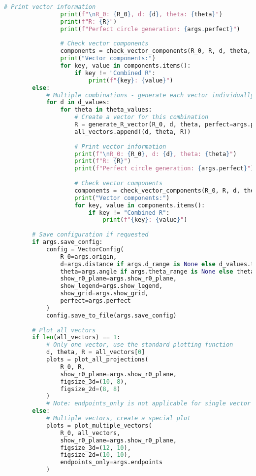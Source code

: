 \begin{lstlisting}[language=Python]
                # Print vector information
                print(f"\nR_0: {R_0}, d: {d}, theta: {theta}")
                print(f"R: {R}")
                print(f"Perfect circle generation: {args.perfect}")
                
                # Check vector components
                components = check_vector_components(R_0, R, d, theta, perfect=args.perfect)
                print("Vector components:")
                for key, value in components.items():
                    if key != "Combined R":
                        print(f"{key}: {value}")
        else:
            # Multiple combinations - generate each vector individually
            for d in d_values:
                for theta in theta_values:
                    # Create a vector for this combination
                    R = generate_R_vector(R_0, d, theta, perfect=args.perfect)
                    all_vectors.append((d, theta, R))
                    
                    # Print vector information
                    print(f"\nR_0: {R_0}, d: {d}, theta: {theta}")
                    print(f"R: {R}")
                    print(f"Perfect circle generation: {args.perfect}")
                    
                    # Check vector components
                    components = check_vector_components(R_0, R, d, theta, perfect=args.perfect)
                    print("Vector components:")
                    for key, value in components.items():
                        if key != "Combined R":
                            print(f"{key}: {value}")
        
        # Save configuration if requested
        if args.save_config:
            config = VectorConfig(
                R_0=args.origin,
                d=args.distance if args.d_range is None else d_values.tolist(),
                theta=args.angle if args.theta_range is None else theta_values.tolist(),
                show_r0_plane=args.show_r0_plane,
                show_legend=args.show_legend,
                show_grid=args.show_grid,
                perfect=args.perfect
            )
            config.save_to_file(args.save_config)
        
        # Plot all vectors
        if len(all_vectors) == 1:
            # Only one vector, use the standard plotting function
            d, theta, R = all_vectors[0]
            plots = plot_all_projections(
                R_0, R,
                show_r0_plane=args.show_r0_plane,
                figsize_3d=(10, 8),
                figsize_2d=(8, 8)
            )
            # Note: endpoints_only is not applicable for single vector in plot_all_projections
        else:
            # Multiple vectors, create a special plot
            plots = plot_multiple_vectors(
                R_0, all_vectors,
                show_r0_plane=args.show_r0_plane,
                figsize_3d=(12, 10),
                figsize_2d=(10, 10),
                endpoints_only=args.endpoints
            )
        

\end{lstlisting}
